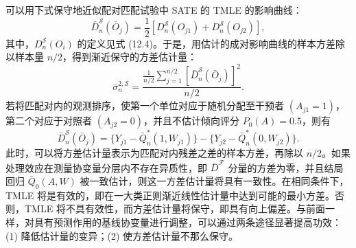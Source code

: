可以用下式保守地近似配对匹配试验中 SATE 的 TMLE 的影响曲线：
\[
\bar D_n^{\mathcal S}(\bar O_j)
=\frac12[D_n^{\mathcal S}(O_{j1})+D_n^{\mathcal S}(O_{j2})],
\]
其中，$D_n^{\mathcal S}(O_i)$ 的定义见式 (12.4)。于是，用估计的成对影响曲线的样本方差除以样本量 $n/2$，得到渐近保守的方差估计量：
\[
\bar\sigma_n^{2,\mathcal S}
=\frac{\frac1{n/2}\sum_{j=1}^{n/2}[\bar D_n^{\mathcal S}(\bar O_j)]^2}{n/2}.
\]
若将匹配对内的观测排序，使第一个单位对应于随机分配至干预者 $(A_{j1}=1)$，第二个对应于对照者 $(A_{j2}=0)$，并且不估计倾向评分 $P_0(A)=0.5$，则有
\[
\bar D_n^{\mathcal S}(\bar O_j)
=\{Y_{j1}-\bar Q_n^*(1,W_{j1})\}
-\{Y_{j2}-\bar Q_n^*(0,W_{j2})\}.
\]
此时，可以将方差估计量表示为匹配对内残差之差的样本方差，再除以 $n/2$。如果处理效应在测量协变量分层内不存在异质性，即 $\bar D^{\mathcal F}$ 分量的方差为零，并且结局回归 $\bar Q_0(A,W)$ 被一致估计，则这一方差估计量将具有一致性。在相同条件下，TMLE 将是有效的，即在一大类正则渐近线性估计量中达到可能的最小方差。否则，TMLE 将不具有效性，而方差估计量将保守，即具有向上偏差。与前面一样，对具有预测作用的基线协变量进行调整，可以通过两条途径显著提高功效：(1) 降低估计量的变异；(2) 使方差估计量不那么保守。
